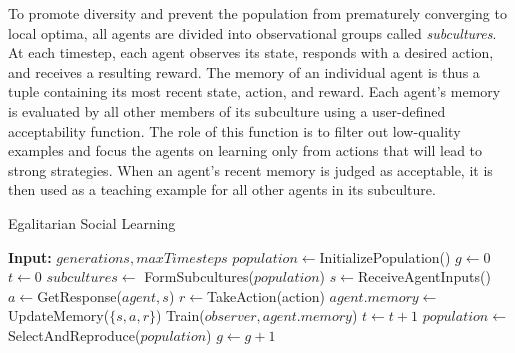 \documentclass{sig-alternate}
\begin{document}
To promote diversity and prevent the population from prematurely converging to local optima, all agents are divided into observational groups called \textit{subcultures}. At each timestep, each agent observes its state, responds with a desired action, and receives a resulting reward. The memory of an individual agent is thus a tuple containing its most recent state, action, and reward. Each agent's memory is evaluated by all other members of its subculture using a user-defined acceptability function. The role of this function is to filter out low-quality examples and focus the agents on learning only from actions that will lead to strong strategies. When an agent's recent memory is judged as acceptable, it is then used as a teaching example for all other agents in its subculture.

\begin{algorithm}
\caption{Egalitarian Social Learning}
\label{reward-algorithm}
\begin{algorithmic}
\STATE \textbf{Input:} $generations, maxTimesteps$
\STATE $population \leftarrow$InitializePopulation()
\STATE $g \leftarrow 0$
\STATE $t \leftarrow 0$
\LOOP
{}
  \STATE $subcultures \leftarrow$ FormSubcultures($population$)
        \STATE $s \leftarrow $ReceiveAgentInputs()
        \STATE $a \leftarrow $GetResponse($agent, s$)
        \STATE $r \leftarrow $TakeAction(action)
        \STATE $agent.memory \leftarrow $UpdateMemory($\{s, a, r\}$)
      \ENDFOR
          \STATE Train($observer, agent.memory$)
        \ENDFOR
      \ENDIF
    \ENDFOR
    \ENDFOR
    \STATE $t \leftarrow t + 1$
  \ENDWHILE
  \STATE $population \leftarrow$SelectAndReproduce($population$)
  \STATE $g \leftarrow g + 1$
\ENDWHILE
\ENDLOOP
\end{algorithmic}
\end{algorithm}


\end{document}
